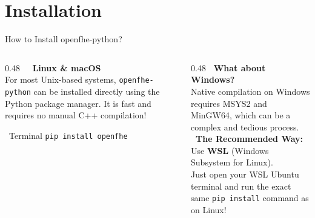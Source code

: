 \documentclass[aspectratio=169, 10pt]{beamer}
\begin{document}
\section{Installation}
\begin{frame}{How to Install openfhe-python?}
\begin{columns}[T]

\begin{column}{0.48\textwidth}
    \vspace{0.2cm}
    \textbf{\textcolor{DeepBlue}{\Large \faLinux \ \faApple \ Linux \& macOS}} \\
    \vspace{0.3cm}
    \normalsize
    For most Unix-based systems, \texttt{openfhe-python} can be installed directly using the Python package manager. It is fast and requires no manual C++ compilation!
    \vspace{0.4cm}
    \begin{exampleblock}{\faTerminal \ Terminal}
        \centering
        \vspace{0.2cm}
        \large \texttt{pip install openfhe}
        \vspace{0.2cm}
    \end{exampleblock}
\end{column}

\begin{column}{0.48\textwidth}
    \vspace{0.2cm}
    \textbf{\textcolor{DeepBlue}{\Large \faWindows \ What about Windows?}} \\
    \vspace{0.3cm}
    \normalsize
    Native compilation on Windows requires MSYS2 and MinGW64, which can be a complex and tedious process. \\
    \vspace{0.4cm}
    \textbf{\textcolor{AccentOrange}{\faLightbulb \ The Recommended Way:}} \\
    Use \textbf{WSL} (Windows Subsystem for Linux).\\ Just open your WSL Ubuntu terminal and run the exact same \texttt{pip install} command as on Linux!
\end{column}

\end{columns}
\end{frame}


\end{document}
